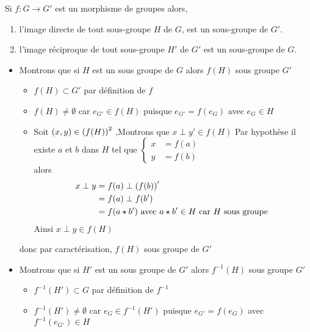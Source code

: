 \begin{defprop}
    Si \(f : G \to G'\) est un morphisme de groupes alors,
    \begin{enumerate}
        \item l’image directe de tout sous-groupe \(H\) de \(G\), est un sous-groupe de \(G'\).
        \item l’image réciproque de tout sous-groupe \(H'\) de \(G'\) est un sous-groupe de \(G\). 
    \end{enumerate}
\end{defprop}
\begin{dem}
    \begin{itemize}
        \item Montrons que si \(H\) est un sous groupe de \(G\) alors \(f(H)\) sous groupe \(G'\)
        \begin{itemize}
            \item \(f(H) \subset G'\) par définition de \(f\)
            \item \(f(H) \neq \emptyset\) car \(e_{G'} \in f(H)\) puisque \(e_{G'} = f(e_G)\) avec \(e_G \in H\)
            \item Soit \(\left(x,y\right) \in \left(f(H)\right)^2\) ,Montrons que \(x \perp y' \in f(H)\) 
            Par hypothèse il existe \(a\) et \(b\) dans \(H\) tel que \(\begin{cases}
                x &= f(a)\\
                y &= f(b)
            \end{cases}\)\\
            alors \begin{align*}
                x \perp y &= f(a) \perp \paren{f(b)}' \\
                &= f(a) \perp f(b')\\
                &= f(a \star b') \hfill \text{ avec } a \star b' \in H \text{ car } H \text{ sous groupe } 
            \end{align*}
            Ainsi \(x \perp y \in f(H)\) 
        \end{itemize}
        donc par caractérisation, \(f(H)\) sous groupe de \(G'\)
        \item Montrons que si \(H'\) est un sous groupe de \(G'\) alors \(f^{-1}(H)\) sous groupe \(G'\)
        \begin{itemize}
            \item \(f^{-1}(H') \subset G\) par définition de \(f^{-1}\)
            \item \(f^{-1}(H') \neq \emptyset\) car \(e_{G} \in f^{-1}(H')\) puisque \(e_{G'} = f(e_G)\) avec \(f^{-1}(e_{G'}) \in H\)

\end{itemize}
\end{itemize}
\end{dem}
